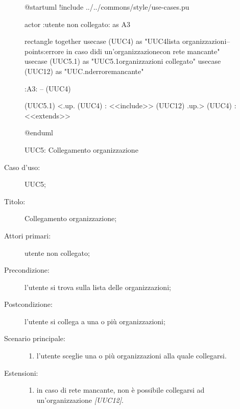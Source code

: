 \documentclass[../../../analisi-dei-requisiti.tex]{subfiles}
\begin{document}
\begin{figure}[H]
  \centering
  \begin{plantuml}
  @startuml
  !include ../../commons/style/use-cases.pu

  actor :utente non collegato: as A3

  rectangle {
    together {
      usecase (UUC4) as "UUC4\nRecupero lista organizzazioni\n--\nExtension points:\nVisualizzazione errore in caso di\nselezionamento di un'organizzazione\n con rete mancante"
      usecase (UUC5.1) as "UUC5.1\nFiltra organizzazioni \nnon collegato"
      usecase (UUC12) as "UUC.nd\nVisualizzazione errore\nrete mancante"
    }
  }

  :A3: -- (UUC4)

  (UUC5.1) <.up. (UUC4) : <<include>>
  (UUC12) .up.> (UUC4) : <<extends>>

  @enduml
  \end{plantuml}
  \caption{UUC5: Collegamento organizzazione}%
  \label{fig:uuc5}
\end{figure}

\begin{description}
  \item[Caso d’uso:] UUC5;
  \item[Titolo:] Collegamento organizzazione;
  \item[Attori primari:] utente non collegato;
  \item[Precondizione:] l'utente si trova sulla lista delle organizzazioni;
  \item[Postcondizione:] l'utente si collega a una o più organizzazioni;
  \item[Scenario principale:]
        \begin{enumerate}
          \item l'utente sceglie una o più organizzazioni alla quale collegarsi.
        \end{enumerate}
  \item[Estensioni:]
        \begin{enumerate}
          \item in caso di rete mancante, non è possibile collegarsi ad un'organizzazione \emph{[UUC12]}.
        \end{enumerate}
\end{description}
\end{document}
